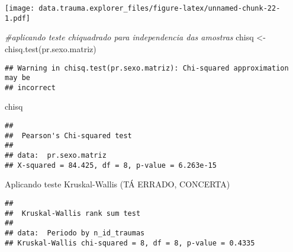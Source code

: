 \documentclass[
]{article}
\newenvironment{Shaded}{\begin{snugshade}}{\end{snugshade}}
\newcommand{\AttributeTok}[1]{\textcolor[rgb]{0.77,0.63,0.00}{#1}}
\newcommand{\CommentTok}[1]{\textcolor[rgb]{0.56,0.35,0.01}{\textit{#1}}}
\newcommand{\FunctionTok}[1]{\textcolor[rgb]{0.00,0.00,0.00}{#1}}
\newcommand{\NormalTok}[1]{#1}
\newcommand{\OtherTok}[1]{\textcolor[rgb]{0.56,0.35,0.01}{#1}}
\newcommand{\SpecialCharTok}[1]{\textcolor[rgb]{0.00,0.00,0.00}{#1}}
\newcommand{\StringTok}[1]{\textcolor[rgb]{0.31,0.60,0.02}{#1}}
\begin{document}
\texttt{[image: data.trauma.explorer\_files/figure-latex/unnamed-chunk-22-1.pdf]}

\begin{Shaded}
\begin{Highlighting}[]
\CommentTok{\#aplicando teste chiquadrado para independencia das amostras}
\NormalTok{chisq }\OtherTok{\textless{}{-}} \FunctionTok{chisq.test}\NormalTok{(pr.sexo.matriz)}
\end{Highlighting}
\end{Shaded}

\begin{verbatim}
## Warning in chisq.test(pr.sexo.matriz): Chi-squared approximation may be
## incorrect
\end{verbatim}

\begin{Shaded}
\begin{Highlighting}[]
\NormalTok{chisq}
\end{Highlighting}
\end{Shaded}

\begin{verbatim}
## 
##  Pearson's Chi-squared test
## 
## data:  pr.sexo.matriz
## X-squared = 84.425, df = 8, p-value = 6.263e-15
\end{verbatim}

Aplicando teste Kruskal-Wallis (TÁ ERRADO, CONCERTA)

\begin{Shaded}
\end{Shaded}

\begin{verbatim}
## 
##  Kruskal-Wallis rank sum test
## 
## data:  Periodo by n_id_traumas
## Kruskal-Wallis chi-squared = 8, df = 8, p-value = 0.4335
\end{verbatim}

\begin{Shaded}
\end{Shaded}
\end{document}
